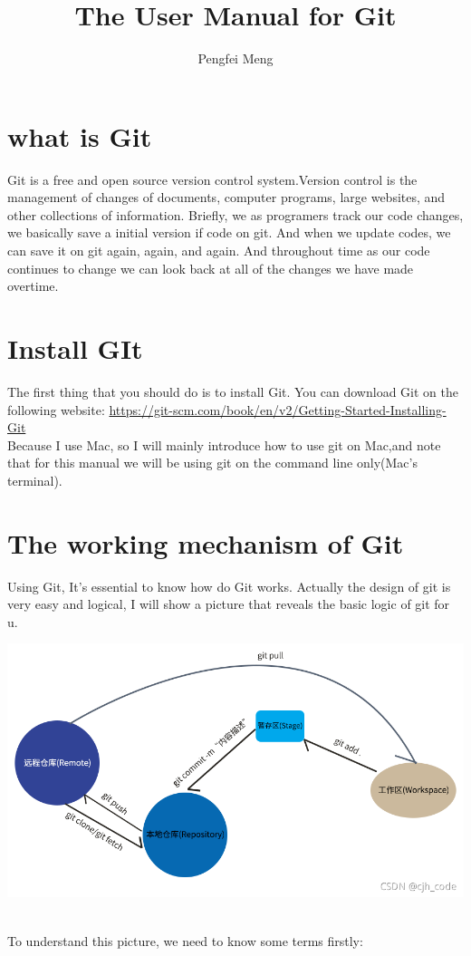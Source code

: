 \documentclass[11pt, oneside]{article}
\title{The User Manual for Git}
\author{Pengfei Meng}
\date{}
\begin{document}
\maketitle
\section{what is Git}
Git is a free and open source version control system.Version control is the management of changes of documents, computer programs, large websites, and other collections of information. Briefly, we as programers track our code changes, we basically save a initial version if code on git. And when we update codes, we can save it on git again, again, and again. And throughout time as our code continues to change we can look back at all of the changes we have made overtime.
\section{Install GIt}
The first thing that you should do is to install Git. You can download Git on the following website:
\href{https://git-scm.com/book/en/v2/Getting-Started-Installing-Git}{https://git-scm.com/book/en/v2/Getting-Started-Installing-Git}\\
Because I use Mac, so I will mainly introduce how to use git on Mac,and note that for this manual we will be using git on the command line only(Mac's terminal).
\section{The working mechanism of Git}
Using Git, It's essential to know how do Git works. Actually the design of git is very easy and logical, I will show a picture that reveals the basic logic of git for u.\\
\centerline{\includegraphics[scale=0.6]{git design.png}}\\
To understand this picture, we need to know some terms firstly:\\
\end{document}
